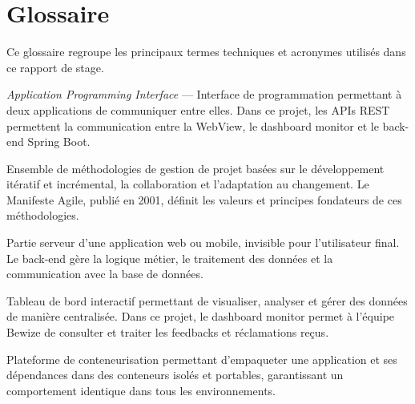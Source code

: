 \chapter*{Glossaire}

\vspace{0.5cm}

Ce glossaire regroupe les principaux termes techniques et acronymes 
utilisés dans ce rapport de stage.

\vspace{0.5cm}

\begin{description}[leftmargin=4cm, labelwidth=3.5cm]

    \item[\textbf{API}] \textit{Application Programming Interface} — 
    Interface de programmation permettant à deux applications de 
    communiquer entre elles. Dans ce projet, les APIs REST permettent 
    la communication entre la WebView, le dashboard monitor et le 
    back-end Spring Boot.

    \vspace{0.3cm}

    \item[\textbf{Agile}] Ensemble de méthodologies de gestion de 
    projet basées sur le développement itératif et incrémental, 
    la collaboration et l'adaptation au changement. Le Manifeste 
    Agile, publié en 2001, définit les valeurs et principes fondateurs 
    de ces méthodologies.

    \vspace{0.3cm}

    \item[\textbf{Back-end}] Partie serveur d'une application web 
    ou mobile, invisible pour l'utilisateur final. Le back-end 
    gère la logique métier, le traitement des données et la 
    communication avec la base de données.

    \vspace{0.3cm}

    \item[\textbf{Dashboard}] Tableau de bord interactif permettant 
    de visualiser, analyser et gérer des données de manière centralisée. 
    Dans ce projet, le dashboard monitor permet à l'équipe Bewize 
    de consulter et traiter les feedbacks et réclamations reçus.

    \vspace{0.3cm}

    \item[\textbf{Docker}] Plateforme de conteneurisation permettant 
    d'empaqueter une application et ses dépendances dans des 
    conteneurs isolés et portables, garantissant un comportement 
    identique dans tous les environnements.


\end{description}
